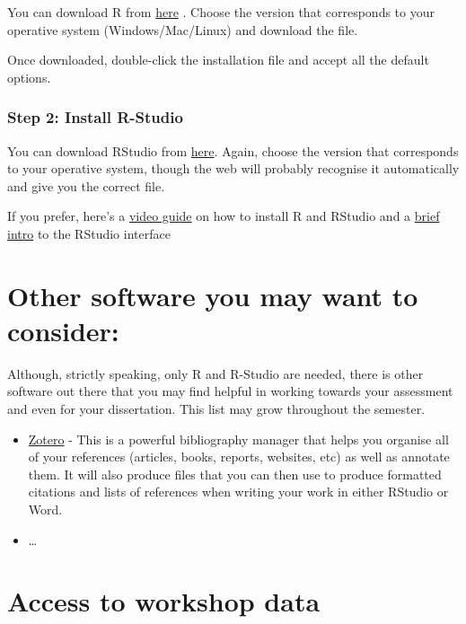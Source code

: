 \documentclass[
  letterpaper,
  DIV=11,
  numbers=noendperiod]{scrreprt}
\begin{document}
You can download R from \href{https://www.stats.bris.ac.uk/R/}{here} .
Choose the version that corresponds to your operative system
(Windows/Mac/Linux) and download the file.

Once downloaded, double-click the installation file and accept all the
default options.

\subsubsection{Step 2: Install R-Studio}\label{step-2-install-r-studio}

You can download RStudio from
\href{https://posit.co/download/rstudio-desktop/}{here}. Again, choose
the version that corresponds to your operative system, though the web
will probably recognise it automatically and give you the correct file.

If you prefer, here's a
\href{https://www.youtube.com/watch?v=ZvPFKfNHBNQ}{video guide} on how
to install R and RStudio and a
\href{https://www.youtube.com/watch?v=HWnanydsBCs.}{brief intro} to the
RStudio interface

\section{Other software you may want to
consider:}\label{other-software-you-may-want-to-consider}

Although, strictly speaking, only R and R-Studio are needed, there is
other software out there that you may find helpful in working towards
your assessment and even for your dissertation. This list may grow
throughout the semester.

\begin{itemize}
\item
  \href{https://www.zotero.org}{Zotero} - This is a powerful
  bibliography manager that helps you organise all of your references
  (articles, books, reports, websites, etc) as well as annotate them. It
  will also produce files that you can then use to produce formatted
  citations and lists of references when writing your work in either
  RStudio or Word.
\item
  \ldots{}
\end{itemize}

\section{Access to workshop data}\label{access-to-workshop-data}
\end{document}
